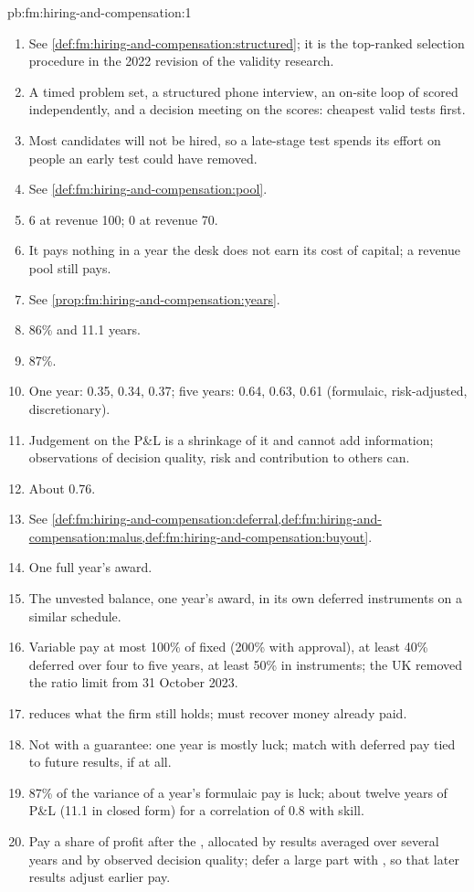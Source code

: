 \begin{solution}{pb:fm:hiring-and-compensation:1}
\begin{enumerate}
\item See \cref{def:fm:hiring-and-compensation:structured}; it is the top-ranked selection procedure in the 2022 revision of the validity
research.
\item A timed problem set, a structured phone interview, an on-site loop of  scored independently, and a decision meeting on
the scores: cheapest valid tests first.
\item Most candidates will not be hired, so a late-stage test spends its effort on people an early test could have removed.
\item See \cref{def:fm:hiring-and-compensation:pool}.
\item 6 at revenue 100; 0 at revenue 70.
\item It pays nothing in a year the desk does not earn its cost of capital; a revenue pool still pays.
\item See \cref{prop:fm:hiring-and-compensation:years}.
\item 86\% and 11.1 years.
\item 87\%.
\item One year: 0.35, 0.34, 0.37; five years: 0.64, 0.63, 0.61 (formulaic, risk-adjusted, discretionary).
\item Judgement on the P\&L is a shrinkage of it and cannot add information; observations of decision quality, risk and contribution to others can.
\item About 0.76.
\item See \cref{def:fm:hiring-and-compensation:deferral,def:fm:hiring-and-compensation:malus,def:fm:hiring-and-compensation:buyout}.
\item One full year's award.
\item The unvested balance, one year's award, in its own deferred instruments on a similar schedule.
\item Variable pay at most 100\% of fixed (200\% with approval), at least 40\% deferred over four to five years, at least 50\% in instruments; the UK
removed the ratio limit from 31 October 2023.
\item {} reduces what the firm still holds;  must recover money already paid.
\item Not with a guarantee: one year is mostly luck; match with deferred pay tied to future results, if at all.
\item 87\% of the variance of a year's formulaic pay is luck; about twelve years of P\&L (11.1 in closed form) for a correlation of 0.8 with skill.
\item Pay a share of profit after the , allocated by results averaged over several years and by observed decision quality; defer a
large part with , so that later results adjust earlier pay.
\end{enumerate}
\end{solution}

